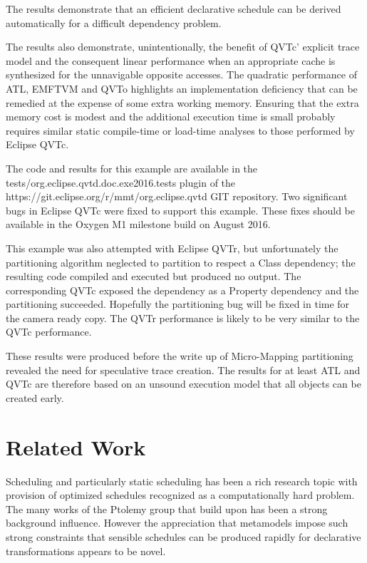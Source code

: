 \documentclass[conference]{IEEEtran}
\begin{document}
The results demonstrate that an efficient declarative schedule can be derived automatically for a difficult dependency problem.

The results also demonstrate, unintentionally, the benefit of QVTc' explicit trace model and the consequent linear performance when an appropriate cache is synthesized for the unnavigable opposite accesses. The quadratic performance of ATL, EMFTVM and QVTo highlights an implementation deficiency that can be remedied at the expense of some extra working memory. Ensuring that the extra memory cost is modest and the additional execution time is small probably requires similar static compile-time or load-time analyses to those performed by Eclipse QVTc.

The code and results for this example are available in the tests/org.eclipse.qvtd.doc.exe2016.tests plugin of the https://git.eclipse.org/r/mmt/org.eclipse.qvtd GIT repository. Two significant bugs in Eclipse QVTc were fixed to support this example. These fixes should be available in the Oxygen M1 milestone build on August 2016.

This example was also attempted with Eclipse QVTr, but unfortunately the partitioning algorithm neglected to partition to respect a Class dependency; the resulting code compiled and executed but produced no output. The corresponding QVTc exposed the dependency as a Property dependency and the partitioning succeeded. Hopefully the partitioning bug will be fixed in time for the camera ready copy. The QVTr performance is likely to be very similar to the QVTc performance.

These results were produced before the write up of Micro-Mapping partitioning revealed the need for speculative trace creation. The results for at least ATL and QVTc are therefore based on an unsound execution model that all objects can be created early. 

\section{Related Work}\label{Related Work}

Scheduling and particularly static scheduling has been a rich research topic with provision of optimized schedules recognized as a computationally hard problem. The many works of the Ptolemy group \cite{dataflow} that build upon \cite{sdf} has been a strong background influence. However the appreciation that metamodels impose such strong constraints that sensible schedules can be produced rapidly for declarative transformations appears to be novel.
\end{document}
